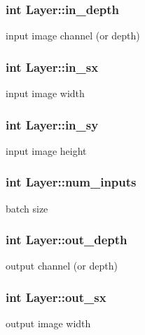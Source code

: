 \subsubsection[{in\+\_\+depth}]{\setlength{\rightskip}{0pt plus 5cm}int Layer\+::in\+\_\+depth}\hypertarget{structLayer_aeb96f45b8f41e8f9c7fa682110755339}{}\label{structLayer_aeb96f45b8f41e8f9c7fa682110755339}
input image channel (or depth) 
\subsubsection[{in\+\_\+sx}]{\setlength{\rightskip}{0pt plus 5cm}int Layer\+::in\+\_\+sx}\hypertarget{structLayer_ae4b3280c4ba2b29c7ddc9ba9e834ad3b}{}\label{structLayer_ae4b3280c4ba2b29c7ddc9ba9e834ad3b}
input image width 
\subsubsection[{in\+\_\+sy}]{\setlength{\rightskip}{0pt plus 5cm}int Layer\+::in\+\_\+sy}\hypertarget{structLayer_ac46fb025649047fafb2cb8206f954f31}{}\label{structLayer_ac46fb025649047fafb2cb8206f954f31}
input image height 
\subsubsection[{num\+\_\+inputs}]{\setlength{\rightskip}{0pt plus 5cm}int Layer\+::num\+\_\+inputs}\hypertarget{structLayer_ad9bc3c0e21161b03f604272605d8fffd}{}\label{structLayer_ad9bc3c0e21161b03f604272605d8fffd}
batch size 
\subsubsection[{out\+\_\+depth}]{\setlength{\rightskip}{0pt plus 5cm}int Layer\+::out\+\_\+depth}\hypertarget{structLayer_ad9871ba11cc56d38fdc754269d1dd551}{}\label{structLayer_ad9871ba11cc56d38fdc754269d1dd551}
output channel (or depth) 
\subsubsection[{out\+\_\+sx}]{\setlength{\rightskip}{0pt plus 5cm}int Layer\+::out\+\_\+sx}\hypertarget{structLayer_ac5003227f797ca48500d217d574a6c4a}{}\label{structLayer_ac5003227f797ca48500d217d574a6c4a}
output image width 
